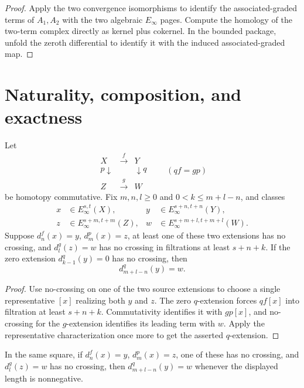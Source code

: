 \begin{proof}
  Apply the two convergence isomorphisms to identify the associated-graded
  terms of $A_1,A_2$ with the two algebraic $E_\infty$ pages.  Compute the
  homology of the two-term complex directly as kernel plus cokernel.  In the
  bounded package, unfold the zeroth differential to identify it with the
  induced associated-graded map.
\end{proof}

\section{Naturality, composition, and exactness}

\begin{theorem}
  \label{thm:fess-commutative-square}
  \notready
  Let
  \[
  \begin{array}{ccc}
    X&\xrightarrow{f}&Y\\
    \mathord{p}\downarrow&&\downarrow\mathord{q}\\
    Z&\xrightarrow{g}&W
  \end{array}
  \qquad(qf=gp)
  \]
  be homotopy commutative.  Fix $m,n,l\ge0$ and
  $0<k\le m+l-n$, and classes
  \[
  \begin{aligned}
    x&\in E_\infty^{s,t}(X),&
    y&\in E_\infty^{s+n,t+n}(Y),\\
    z&\in E_\infty^{s+m,t+m}(Z),&
    w&\in E_\infty^{s+m+l,t+m+l}(W).
  \end{aligned}
  \]
  Suppose $d_n^f(x)=y$, $d_m^p(x)=z$, at least one of these two extensions
  has no crossing, and $d_l^g(z)=w$ has no crossing in filtrations at least
  $s+n+k$.  If the zero extension $d_{k-1}^q(y)=0$ has no crossing, then
  \[
    d_{m+l-n}^q(y)=w.
  \]
\end{theorem}

\begin{proof}
  Use no-crossing on one of the two source extensions to choose a single
  representative $[x]$ realizing both $y$ and $z$.  The zero $q$-extension
  forces $qf[x]$ into filtration at least $s+n+k$.  Commutativity identifies
  it with $gp[x]$, and no-crossing for the $g$-extension identifies its leading
  term with $w$.  Apply the representative characterization once more to get
  the asserted $q$-extension.
\end{proof}

\begin{corollary}
  \label{cor:fess-square-naturality}
  \notready
  In the same square, if $d_n^f(x)=y$, $d_m^p(x)=z$, one of these has no
  crossing, and $d_l^g(z)=w$ has no crossing, then
  $d_{m+l-n}^q(y)=w$ whenever the displayed length is nonnegative.
\end{corollary}

